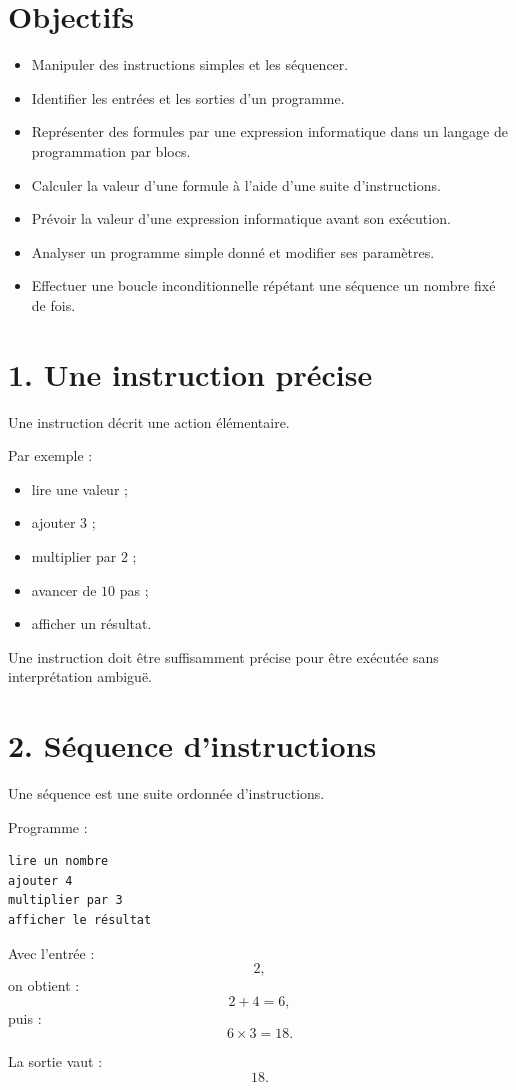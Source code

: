 
\section{Objectifs}

\begin{itemize}
\item Manipuler des instructions simples et les séquencer.
\item Identifier les entrées et les sorties d'un programme.
\item Représenter des formules par une expression informatique dans un langage de programmation par blocs.
\item Calculer la valeur d'une formule à l'aide d'une suite d'instructions.
\item Prévoir la valeur d'une expression informatique avant son exécution.
\item Analyser un programme simple donné et modifier ses paramètres.
\item Effectuer une boucle inconditionnelle répétant une séquence un nombre fixé de fois.
\end{itemize}

\section{1. Une instruction précise}

Une instruction décrit une action élémentaire.

Par exemple :
\begin{itemize}
\item lire une valeur ;
\item ajouter $3$ ;
\item multiplier par $2$ ;
\item avancer de $10$ pas ;
\item afficher un résultat.
\end{itemize}

Une instruction doit être suffisamment précise pour être exécutée sans interprétation ambiguë.

\section{2. Séquence d'instructions}

Une séquence est une suite ordonnée d'instructions.

\begin{exemple}
Programme :
\begin{verbatim}
lire un nombre
ajouter 4
multiplier par 3
afficher le résultat
\end{verbatim}

Avec l'entrée :
\[
2,
\]
on obtient :
\[
2+4=6,
\]
puis :
\[
6\times3=18.
\]

La sortie vaut :
\[
\boxed{18}.
\]
\end{exemple}

